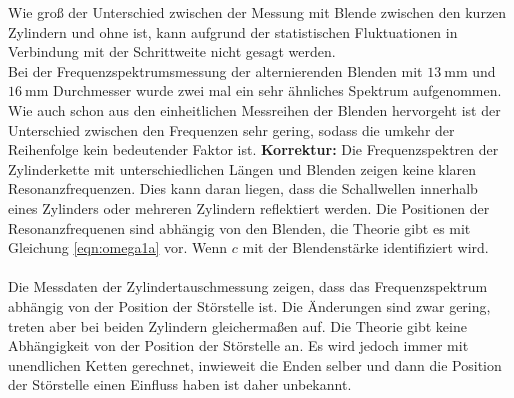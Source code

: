 Wie groß der Unterschied zwischen der Messung mit Blende zwischen den kurzen Zylindern und ohne ist,
kann aufgrund der statistischen Fluktuationen in Verbindung mit der Schrittweite nicht gesagt werden.
\\
Bei der Frequenzspektrumsmessung der alternierenden Blenden mit $\SI{13}{\milli\meter}$ und $\SI{16}{\milli\meter}$ Durchmesser wurde zwei mal ein sehr ähnliches Spektrum aufgenommen.
Wie auch schon aus den einheitlichen Messreihen der Blenden hervorgeht ist der Unterschied zwischen den Frequenzen sehr gering, sodass die umkehr der Reihenfolge kein bedeutender Faktor ist.
\newpage
\textbf{Korrektur:}
Die Frequenzspektren der Zylinderkette mit unterschiedlichen Längen und Blenden
zeigen keine klaren Resonanzfrequenzen.
Dies kann daran liegen, dass die Schallwellen innerhalb eines Zylinders oder mehreren Zylindern
reflektiert werden. Die Positionen der Resonanzfrequenen sind abhängig von den Blenden,
die Theorie gibt es mit Gleichung \eqref{eqn:omega1a} vor. Wenn $c$ mit der Blendenstärke
identifiziert wird.
\\~\\
Die Messdaten der Zylindertauschmessung zeigen, dass das Frequenzspektrum
abhängig von der Position der Störstelle ist.
Die Änderungen sind zwar gering, treten aber bei beiden Zylindern gleichermaßen auf.
Die Theorie gibt keine Abhängigkeit von der Position der Störstelle an.
Es wird jedoch immer mit unendlichen Ketten gerechnet, inwieweit die Enden selber
und dann die Position der Störstelle einen Einfluss haben ist daher unbekannt.
